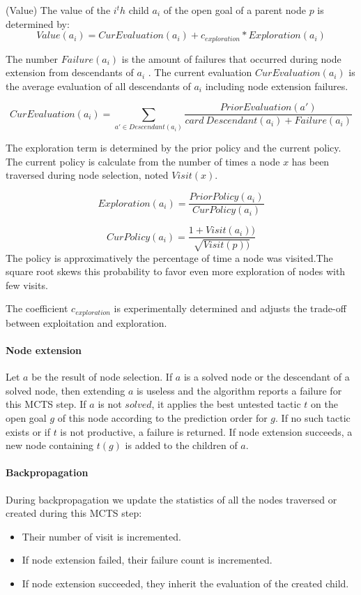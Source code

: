\documentclass[runningheads,a4paper,draft]{svjour3}
\begin{document}
\begin{definition}\label{def:value}(Value)
The value of the $i^th$ child $a_i$ of the open goal of a parent node $p$
is determined by:
\[\mathit{Value}(a_i) = \mathit{CurEvaluation}(a_i) + c_{exploration} *
\mathit{Exploration}(a_i)\]

The number $\mathit{Failure}(a_i)$ is the amount of failures that occurred
during node extension from descendants of $a_i$ .
The current evaluation $CurEvaluation(a_i)$ is the average evaluation of
all descendants of $a_i$ including node extension failures.

\[\mathit{CurEvaluation}(a_i) =
  \sum_{a' \in Descendant(a_i)} \frac{\mathit{PriorEvaluation}(a')} {card\
  \mathit{Descendant}(a_i) + \mathit{Failure}(a_i)}\]


The exploration term is determined by the prior policy and the current policy.
The current policy is calculate from the number of times a node $x$ has been
traversed during node selection, noted $\mathit{Visit}(x)$.

\[\mathit{Exploration}(a_i) =
\frac{\mathit{PriorPolicy}(a_i)}{\mathit{CurPolicy}(a_i)}\]

\[\mathit{CurPolicy}(a_i) = \frac{1 +
\mathit{Visit}(a_i))}{\sqrt{\mathit{Visit}(p))}}\]
The policy is approximatively the  percentage of time a node was visited.The
square root skews this probability to favor even more exploration of nodes with
few visits.

The coefficient $c_{exploration}$ is experimentally determined and adjusts the
trade-off between exploitation and exploration.
\end{definition}

\paragraph{Node extension}
Let $a$ be the result of node selection.
If $a$ is a solved node or the descendant of a solved node, then extending $a$
is useless and the algorithm reports a failure for this MCTS step.
If $a$ is not $solved$, it applies the best untested tactic $t$ on the open
goal $g$ of this
node according to the prediction order for $g$. If no such tactic exists or if
$t$ is not productive, a failure is returned.
If node extension succeeds, a new node containing $t(g)$ is added to the
children of $a$.


\paragraph{Backpropagation}
During backpropagation we update the statistics of all the nodes traversed or
created during this MCTS step:
\begin{itemize}
\item Their number of visit is incremented.
\item If node extension failed, their failure count is incremented.
\item If node extension succeeded, they inherit the evaluation of the created
child.
\end{itemize}
\end{document}
